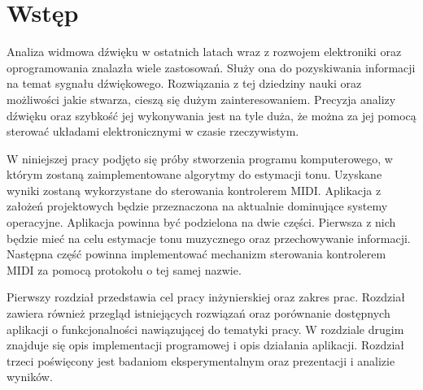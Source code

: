 \chapter*{Wstęp}
\label{wstęp}
\thispagestyle{empty}

Analiza widmowa dźwięku w ostatnich latach wraz z rozwojem elektroniki oraz oprogramowania znalazła wiele zastosowań. Służy ona do pozyskiwania informacji na temat sygnału dźwiękowego. Rozwiązania z tej dziedziny nauki oraz możliwości jakie stwarza, cieszą się dużym zainteresowaniem. Precyzja analizy dźwięku oraz szybkość jej wykonywania jest na tyle duża, że można za jej pomocą sterować układami elektronicznymi w czasie rzeczywistym.

	W niniejszej pracy podjęto się próby stworzenia programu komputerowego, w którym zostaną zaimplementowane algorytmy do estymacji tonu. Uzyskane wyniki zostaną wykorzystane do sterowania kontrolerem MIDI. Aplikacja z założeń projektowych będzie przeznaczona na aktualnie dominujące systemy operacyjne. Aplikacja powinna być podzielona na dwie części. Pierwsza z nich będzie mieć na celu estymacje tonu muzycznego oraz przechowywanie informacji. Następna część powinna implementować mechanizm sterowania kontrolerem MIDI za pomocą protokołu o tej samej nazwie.
	
Pierwszy rozdział przedstawia cel pracy inżynierskiej oraz zakres prac. Rozdział zawiera również przegląd istniejących rozwiązań oraz porównanie dostępnych aplikacji o funkcjonalności nawiązującej do tematyki pracy. W rozdziale drugim znajduje się opis implementacji programowej i opis działania aplikacji. Rozdział trzeci poświęcony jest badaniom eksperymentalnym oraz prezentacji i analizie wyników.